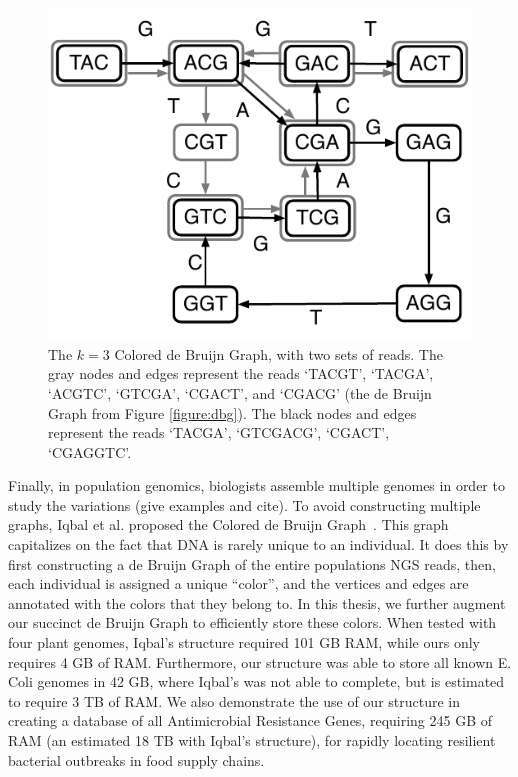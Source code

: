 \begin{figure}
	\begin{center}
		\includegraphics*[scale=0.70]{images/cdbg.pdf}
		\caption{The $k=3$ Colored de Bruijn Graph, with two sets of reads. The gray nodes and edges represent the reads `TACGT', `TACGA', `ACGTC', `GTCGA', `CGACT', and `CGACG' (the de Bruijn Graph from Figure \ref{figure:dbg}). The black nodes and edges represent the reads `TACGA', `GTCGACG', `CGACT', `CGAGGTC'.}
		\label{figure:cdbg}
	\end{center}
\end{figure}

Finally, in population genomics, biologists assemble multiple genomes in order to study the variations (give examples and cite). To avoid constructing multiple graphs, Iqbal et al. proposed the Colored de Bruijn Graph~\cite{ICTFM12}. This graph capitalizes on the fact that DNA is rarely unique to an individual. It does this by first constructing a de Bruijn Graph of the entire populations NGS reads, then, each individual is assigned a unique “color”, and the vertices and edges are annotated with the colors that they belong to. In this thesis, we further augment our succinct de Bruijn Graph to efficiently store these colors. When tested with four plant genomes, Iqbal’s structure required 101 GB RAM, while ours only requires 4 GB of RAM. Furthermore, our structure was able to store all known E. Coli genomes in 42 GB, where Iqbal’s was not able to complete, but is estimated to require 3 TB of RAM. We also demonstrate the use of our structure in creating a database of all Antimicrobial Resistance Genes, requiring 245 GB of RAM (an estimated 18 TB with Iqbal’s structure), for rapidly locating resilient bacterial outbreaks in food supply chains.




